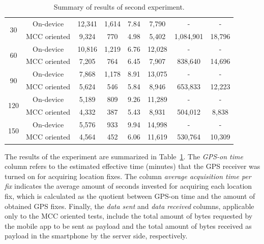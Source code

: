 \documentclass[ENG,PhD]{cinvestav}
\begin{document}
\begin{table}
{\begin{tabular}{@{}cccccccc@{}}
\multirow{2}{*}{30}  & On-device   &  12,341 & 1,614 & 7.84  & 7,790 & - & - \\
                          & MCC oriented &  9,324 &   770 & 4.98  & 5,402 & 1,084,901 & 18,796 \\
\cmidrule(l){2-8}
\multirow{2}{*}{60}  & On-device    & 10,816 & 1,219 & 6.76 & 12,028 & - & - \\
                          & MCC oriented &  7,205 &   764 & 6.45 &  7,907 & 838,640 & 14,696 \\
\cmidrule(l){2-8}
\multirow{2}{*}{90}  & On-device    & 7,868 & 1,178 & 8.91 & 13,075 & - & - \\
                          & MCC oriented & 5,624 &   546 & 5.84 &  8,946 & 653,833 & 12,223 \\
\cmidrule(l){2-8}
\multirow{2}{*}{120} & On-device    & 5,189 & 809 & 9.26 & 11,289 & - & - \\
                          & MCC oriented & 4,332 & 387 & 5.43 &  8,931 & 504,012 & 8,838 \\
\cmidrule(l){2-8}
\multirow{2}{*}{150} & On-device    & 5,576 & 933 & 9.94 & 14,998 & - & - \\
                          & MCC oriented & 4,564 & 452 & 6.06 & 11,619 & 530,764 & 10,309 \\
\bottomrule
\end{tabular}%
}
\caption{Summary of results of second experiment.}
\label{tbl:experiment-2}
\end{table}


The results of the experiment are summarized in Table~\ref{tbl:experiment-2}.
The \emph{GPS-on time} column refers to the estimated effective time (minutes) that the GPS receiver was turned on for acquiring location fixes.
The column \emph{average acquisition time per fix} indicates the average amount of seconds invested for acquiring each location fix, which is calculated as the quotient between GPS-on time and the amount of obtained GPS fixes.
Finally, the \emph{data sent} and \emph{data received} columns, applicable only to the MCC oriented tests, include the total amount of bytes requested by the mobile app to be sent as payload and the total amount of bytes received as payload in the smartphone by the server side, respectively.
\end{document}
